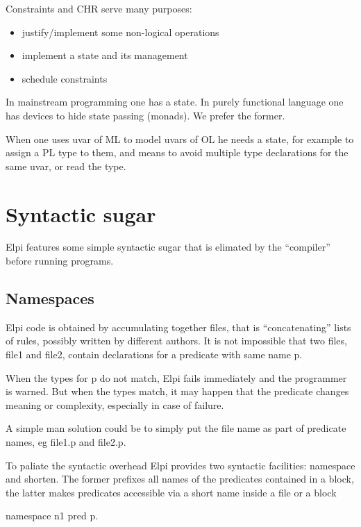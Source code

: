 \documentclass[a4paper, 11pt]{book}
\begin{document}
Constraints and CHR serve many purposes:
\begin{itemize}
  \item justify/implement some non-logical operations
  \item implement a state and its management
  \item schedule constraints
\end{itemize}

In mainstream programming one has a state. In purely functional language
one has devices to hide state passing (monads). We prefer the former.

When one uses uvar of ML to model uvars of OL he needs a state, for example
to assign a PL type to them, and means to avoid multiple type declarations for the same
uvar, or read the type.


\section{Syntactic sugar}

Elpi features some simple syntactic sugar that is elimated by
the ``compiler'' before running programs.

\subsection{Namespaces}

Elpi code is obtained by accumulating together files, that is
``concatenating'' lists of rules, possibly written by different
authors. It is not impossible that
two files, file1 and file2, contain declarations for a predicate with same name p.

When the types for p do not match, Elpi fails immediately
and the programmer is warned. But when the types match, it may
happen that the predicate changes meaning or complexity,
especially in case of failure.

A simple man solution could be to simply put the file name
as part of predicate names, eg file1.p and file2.p.

To paliate the syntactic overhead Elpi provides two syntactic
facilities: namespace and shorten. The former prefixes all
names of the predicates contained in a block, the latter makes
predicates accessible via a short name inside a file or a block

\begin{elpicode}
namespace n1 {
  pred p.
}
\end{elpicode}
\end{document}
